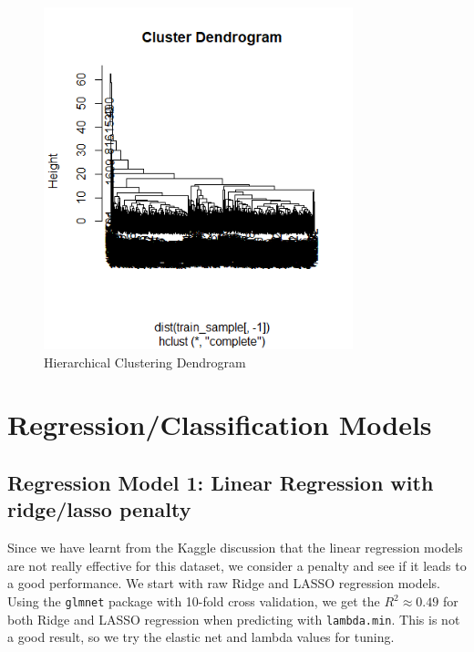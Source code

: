 \documentclass[8pt]{article}
\begin{document}
\begin{figure}[h]
    \centering
    \includegraphics[width=0.8\textwidth]{unsupervised_figures/hclust_pca.png}
    \caption{Hierarchical Clustering Dendrogram}
    \label{fig:hierarchical_dendrogram}
\end{figure}

\section{Regression/Classification Models}

\subsection{Regression Model 1: Linear Regression with ridge/lasso penalty}
Since we have learnt from the Kaggle discussion that the linear regression models are not really effective for this dataset, 
we consider a penalty and see if it leads to a good performance. 
We start with raw Ridge and LASSO regression models. Using the \texttt{glmnet} package with 10-fold cross validation, 
we get the $R^2 \approx 0.49$ for both Ridge and LASSO regression when predicting with \texttt{lambda.min}. 
This is not a good result, so we try the elastic net and lambda values for tuning. 
\end{document}
